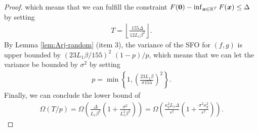 \begin{proof}
which means that we can fulfill the constraint $F({\bm{0}}) - \inf_{{\bm{x}} \in {\mathbb{R}}^T} F({\bm{x}}) \le \Delta$ by setting
\begin{align} \label{eq:para-T-stoc}
      T = \left \lfloor 
     \frac{155 \Delta}{12 L_1 \beta^2} 
    \right \rfloor.
\end{align}
By Lemma \ref{lem:Arj-random} (item 3), the variance of the SFO for $(f,g)$ is upper bounded by $ (23 L_1 \beta / 155)^2$ $(1-p)/p $, which means that we can let the variance be bounded by $\sigma^2$ by setting
\begin{align} \label{eq:para-p-stoc}
    p = \min \left\{  1, \left( \frac{23 L_1 \beta}{\sigma 155} \right)^2 \right\}.
\end{align}
Finally, we can conclude the lower bound of 
\begin{align*}
    \Omega(T/p) = \Omega \left( \frac{\Delta}{L_1 \beta^2} \left(1+ \frac{\sigma^2}{L_1^2 \beta^2} \right)  \right) = \Omega \left( \frac{\kappa_y^2 L_1 \Delta }{\epsilon^2} \left( 1+ \frac{\sigma^2 \kappa_y^2}{\epsilon^2} \right)\right).
\end{align*}
\end{proof}
